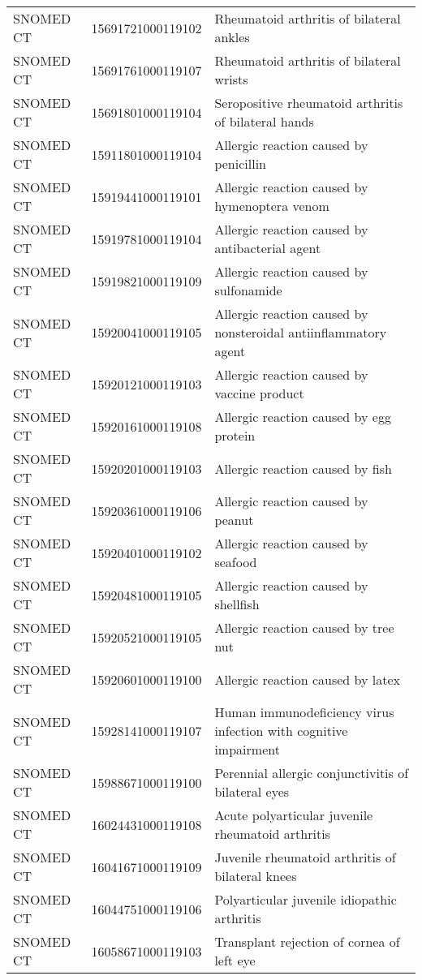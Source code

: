 \begin{longtable}{p{}p{}p{}}
  SNOMED CT & 15691721000119102 & Rheumatoid arthritis of bilateral ankles \\ 
  SNOMED CT & 15691761000119107 & Rheumatoid arthritis of bilateral wrists \\ 
  SNOMED CT & 15691801000119104 & Seropositive rheumatoid arthritis of bilateral hands \\ 
  SNOMED CT & 15911801000119104 & Allergic reaction caused by penicillin \\ 
  SNOMED CT & 15919441000119101 & Allergic reaction caused by hymenoptera venom \\ 
  SNOMED CT & 15919781000119104 & Allergic reaction caused by antibacterial agent \\ 
  SNOMED CT & 15919821000119109 & Allergic reaction caused by sulfonamide \\ 
  SNOMED CT & 15920041000119105 & Allergic reaction caused by nonsteroidal antiinflammatory agent \\ 
  SNOMED CT & 15920121000119103 & Allergic reaction caused by vaccine product \\ 
  SNOMED CT & 15920161000119108 & Allergic reaction caused by egg protein \\ 
  SNOMED CT & 15920201000119103 & Allergic reaction caused by fish \\ 
  SNOMED CT & 15920361000119106 & Allergic reaction caused by peanut \\ 
  SNOMED CT & 15920401000119102 & Allergic reaction caused by seafood \\ 
  SNOMED CT & 15920481000119105 & Allergic reaction caused by shellfish \\ 
  SNOMED CT & 15920521000119105 & Allergic reaction caused by tree nut \\ 
  SNOMED CT & 15920601000119100 & Allergic reaction caused by latex \\ 
  SNOMED CT & 15928141000119107 & Human immunodeficiency virus infection with cognitive impairment \\ 
  SNOMED CT & 15988671000119100 & Perennial allergic conjunctivitis of bilateral eyes \\ 
  SNOMED CT & 16024431000119108 & Acute polyarticular juvenile rheumatoid arthritis \\ 
  SNOMED CT & 16041671000119109 & Juvenile rheumatoid arthritis of bilateral knees \\ 
  SNOMED CT & 16044751000119106 & Polyarticular juvenile idiopathic arthritis \\ 
  SNOMED CT & 16058671000119103 & Transplant rejection of cornea of left eye \\ 

\end{longtable}
